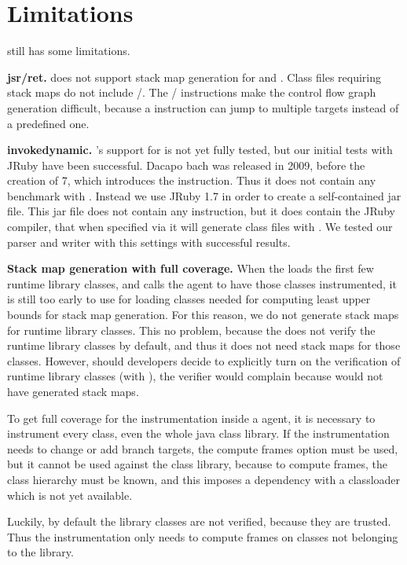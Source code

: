 \section{Limitations}\label{sec:jnif-limitations}

\jnif{} still has some limitations.

\textbf{jsr/ret.} \jnif{} does not support stack map generation for  and .
Class files requiring stack maps do not include /.
The / instructions make the control flow graph generation difficult, because a  instruction can jump to multiple targets instead of a predefined one.

\textbf{invokedynamic.} \jnif{}'s support for  is not yet fully tested, 
but our initial tests with JRuby have been successful.
Dacapo bach was released in 2009,
before the creation of \java{} 7,
which introduces the  instruction.
Thus it does not contain any benchmark with .
Instead we use JRuby 1.7 in order to create a self-contained jar file. 
This jar file does not contain any  instruction, 
but it does contain the JRuby compiler, 
that when specified via  it will generate class files with . 
We tested our parser and writer with this settings with successful results.

\textbf{Stack map generation with full coverage.}
When the \jvm{} loads the first few runtime library classes,
and calls the \jvmti{} agent to have those classes instrumented,
it is still too early to use \jni{} for loading classes needed for computing least upper bounds for stack map generation.
For this reason, we do not generate stack maps for runtime library classes.
This no problem, because the \jvm{} does not verify the runtime library classes by default,
and thus it does not need stack maps for those classes.
However, should developers decide to explicitly turn on the verification of runtime library classes
(with ), the verifier would complain because \jnif{} would not have generated stack maps.

To get full coverage for the instrumentation inside a \jvmti{} agent, 
it is necessary to instrument every class, 
even the whole java class library.
If the instrumentation needs to change or add branch targets, 
the compute frames option must be used, 
but it cannot be used against the class library,
because to compute frames, 
the class hierarchy must be known,
and this imposes a dependency with a classloader which is not yet available.

Luckily, by default the \java{} library classes are not verified,
because they are trusted. 
Thus the instrumentation only needs to compute frames on classes not belonging to the \java{} library.
